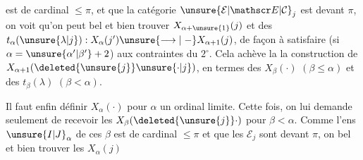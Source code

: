 est de cardinal $\leq\pi$, et que la catégorie $\unsure{\mathcal E|\mathscr E|\mathcal C}_j$ est  devant $\pi$, on voit qu'on peut bel et bien trouver $X_{\alpha+\unsure{1}}(j)$ et des $t_\alpha(\unsure{\lambda|j}):X_\alpha(j')\unsure{\longrightarrow|\mathrel{-}}X_{\alpha+1}(j)$, de façon à satisfaire (si $\alpha=\unsure{\alpha'|\beta'}+2$) aux contraintes  du $2^\circ$. Cela achève la  la construction de $X_{\alpha+1}(\deleted{\unsure{j}}\unsure{\cdot|j})$, en termes des  $X_\beta(\cdot)$ $(\beta\leq\alpha)$ et des $t_\beta(\lambda)$ $(\beta<\alpha)$.

Il faut enfin définir $X_\alpha(\cdot)$ pour $\alpha$ un ordinal limite. Cette fois, on lui demande seulement de recevoir les $X_\beta(\deleted{\unsure{j}}\cdot)$ pour $\beta<\alpha$. Comme l'ens $\unsure{I|J}_\alpha$ de ces $\beta$ est de cardinal $\leq\pi$ et que les $\mathcal E_j$ sont  devant $\pi$, on  bel et bien trouver les $X_\alpha(j)$
